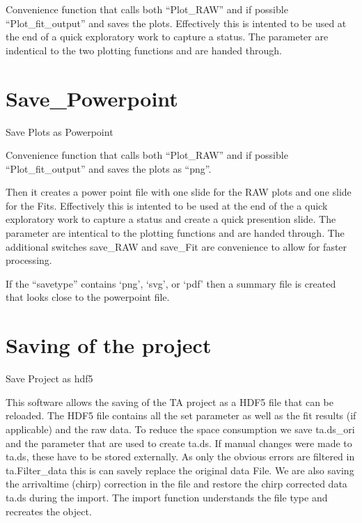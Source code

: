 \documentclass[letterpaper,10pt,english]{sphinxmanual}
\begin{document}
Convenience function that calls both “Plot\_RAW” and if possible
“Plot\_fit\_output” and saves the plots. Effectively this is intented to
be used at the end of a quick exploratory work to capture a status. The
parameter are indentical to the two plotting functions and are handed
through.


\section{Save\_Powerpoint}
\label{\detokenize{Saving:save-powerpoint}}
Save Plots as Powerpoint                {\hyperref[\detokenize{plot_func:plot_func.TA.Save_Powerpoint}]{}}

Convenience function that calls both “Plot\_RAW” and if possible
“Plot\_fit\_output” and saves the plots as “png”.

Then it creates a power point file with one slide for the RAW plots and
one slide for the Fits.
Effectively this is intented to be used at the end of the a quick
exploratory work to capture a status and create a quick presention
slide. The parameter are intentical to the plotting functions and are
handed through. The additional switches save\_RAW and save\_Fit are
convenience to allow for faster processing.

If the “savetype” contains ‘png’, ‘svg’, or ‘pdf’ then a summary file is created
that looks close to the powerpoint file.


\section{Saving of the  project}
\label{\detokenize{Saving:saving-of-the-project}}
Save Project as hdf5                    {\hyperref[\detokenize{plot_func:plot_func.TA.Save_project}]{}}

This software allows the saving of the TA project as a HDF5 file that
can be reloaded. The HDF5 file contains all the set parameter as well as
the fit results (if applicable) and the raw data. To reduce the space
consumption we save ta.ds\_ori and the parameter that are used to create
ta.ds. If manual changes were made to ta.ds, these have to be stored
externally. As only the obvious errors are filtered in ta.Filter\_data
this is can savely replace the original data File. We are also saving
the arrival\sphinxhyphen{}time (chirp) correction in the file and restore the chirp
corrected data ta.ds during the import. The import function understands
the file type and re\sphinxhyphen{}creates the object.
\end{document}
